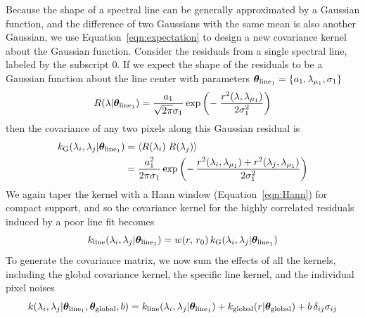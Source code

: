 \documentclass[preprint]{aastex} %
\newcommand{\vt}{ {\bm \theta}}
\newcommand{\vtglobal}{\vt_{\rm global}}
\newcommand{\vtline}[1]{\vt_{{\rm line}_{#1}}}
\begin{document}
Because the shape of a spectral line can be generally approximated by a Gaussian function, and the difference of two Gaussians with the same mean is also another Gaussian, we use Equation~\ref{eqn:expectation} to design a new covariance kernel about the Gaussian function. Consider the residuals from a single spectral line, labeled by the subscript $0$. If we expect the shape of the residuals to be a Gaussian function about the line center with parameters $\vt_{{\rm line}_1} = \{ a_1, \lambda_{\mu_1}, \sigma_1 \}$
\begin{equation}
  R(\lambda | \vtline{1} ) = \frac{a_1}{\sqrt{2 \pi} \sigma_1} \exp \left (-\; \frac{r^2(\lambda, \lambda_{\mu_1})}{2 \sigma_1^2} \right )
\end{equation}
then the covariance of any two pixels along this Gaussian residual is 
\begin{align}
  k_{\rm G}(\lambda_i, \lambda_j |\vtline{1} ) &= \langle R(\lambda_i)\; R(\lambda_j) \rangle \\
  &= \frac{a_1^2}{2 \pi \sigma_1} \exp \left ( - \, \frac{r^2(\lambda_i, \lambda_{\mu_1}) 
  + r^2(\lambda_j, \lambda_{\mu_1})}{2 \sigma_1^2}\right )
\end{align}
We again taper the kernel with a Hann window (Equation~\ref{eqn:Hann}) for compact support, and so the covariance kernel for the highly correlated residuals induced by a poor line fit becomes
\begin{equation}
  k_{\rm line}(\lambda_i, \lambda_j |\vtline{1} ) = w(r,\, r_0)\, k_{\rm G}(\lambda_i, \lambda_j | \vt_{{\rm line}_1})
  \label{eqn:line}
\end{equation}
To generate the covariance matrix, we now sum the effects of all the kernels, including the global covariance kernel, the specific line kernel, and the individual pixel noises
\begin{equation}
  k(\lambda_i, \lambda_j | \vtline{1}, \vtglobal, b) = k_{\rm line}(\lambda_i, \lambda_j |\vtline{1}) + k_{\rm global}(r | \vtglobal) + b\,\delta_{ij} \sigma_{ij}
  \label{eqn:line_total}
\end{equation}
\end{document}
